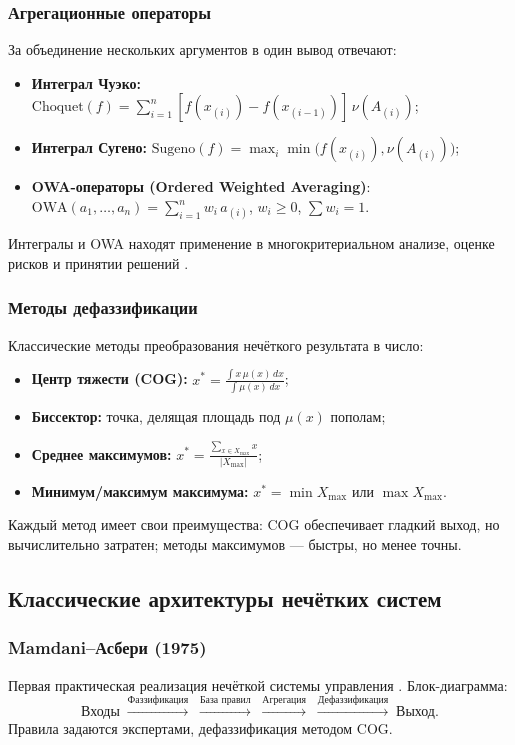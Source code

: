 \subsubsection{Агрегационные операторы}
За объединение нескольких аргументов в один вывод отвечают:
\begin{itemize}
  \item \textbf{Интеграл Чуэко:}
    \(\mathrm{Choquet}(f) = \sum_{i=1}^n [f(x_{(i)}) - f(x_{(i-1)})]\,\nu(A_{(i)})\);
  \item \textbf{Интеграл Сугено:}
    \(\mathrm{Sugeno}(f) = \max_i \min\bigl(f(x_{(i)}), \nu(A_{(i)})\bigr)\);
  \item \textbf{OWA-операторы (Ordered Weighted Averaging)}: 
    \(\mathrm{OWA}(a_1,\dots,a_n) = \sum_{i=1}^n w_i\,a_{(i)}\), \(w_i\ge0\), \(\sum w_i=1\).
\end{itemize}
Интегралы и OWA находят применение в многокритериальном анализе, оценке рисков и принятии решений \cite{Dubois2000}.

\subsubsection{Методы дефаззификации}
Классические методы преобразования нечёткого результата в число:
\begin{itemize}
  \item \textbf{Центр тяжести (COG):}
    \(x^* = \frac{\int x\,\mu(x)\,dx}{\int \mu(x)\,dx}\);
  \item \textbf{Биссектор:} точка, делящая площадь под \(\mu(x)\) пополам;
  \item \textbf{Среднее максимумов:} 
    \(x^* = \frac{\sum_{x\in X_{\max}} x}{|X_{\max}|}\);
  \item \textbf{Минимум/максимум максимума:} 
    \(x^* = \min X_{\max}\) или \(\max X_{\max}\).
\end{itemize}
Каждый метод имеет свои преимущества: COG обеспечивает гладкий выход, но вычислительно затратен; методы максимумов --- быстры, но менее точны.

\subsection{Классические архитектуры нечётких систем}
\label{subsec:architectures}

\subsubsection{Mamdani–Асбери (1975)}
Первая практическая реализация нечёткой системы управления \cite{Mamdani1975}. Блок-диаграмма:
\[
  \text{Входы} \;\xrightarrow{\text{Фаззификация}}\; 
  \xrightarrow{\text{База правил}}\;\xrightarrow{\text{Агрегация}}\;
  \xrightarrow{\text{Дефаззификация}}\;\text{Выход}.
\]
Правила задаются экспертами, дефаззификация методом COG.

